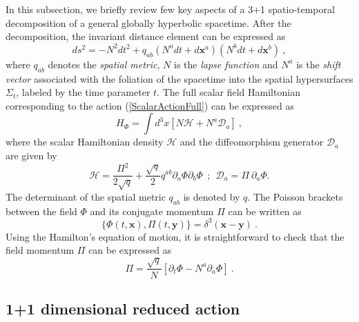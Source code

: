 \documentclass[aps,twocolumn,showpacs]{revtex4}
\def\x{\mathbf{x}}
\def\y{\mathbf{y}}
\begin{document}
In this subsection, we briefly review few key aspects of a 3+1 
spatio-temporal decomposition \cite{book:3plus1} of a general globally 
hyperbolic spacetime. After the decomposition, the invariant distance element 
can be expressed as
%
\begin{equation}\label{GeneralMetricIn31}
ds^2 = -N^2 dt^2 + q_{ab}(N^a dt+d\x^{a})(N^b dt + d\x^{b}) ~,
\end{equation}
% 
where $q_{ab}$ denotes the \emph{spatial metric}, $N$ is the \emph{lapse 
function} and $N^a$ is the \emph{shift vector} associated with the foliation of 
the spacetime into the spatial hypersurfaces $\Sigma_t$, labeled by the 
time parameter $t$.
%
The full scalar field Hamiltonian corresponding to the action 
(\ref{ScalarActionFull}) can be expressed as
%
\begin{equation}\label{GeneralScalarFieldHamiltonianFull}
H_{\Phi} = \int d^{3}x \left[ N \mathcal{H} + N^a \mathcal{D}_a \right] ~,
\end{equation}
%
where the scalar Hamiltonian density $\mathcal{H}$ and the diffeomorphism 
generator $\mathcal{D}_a$ are given by
%
\begin{equation}\label{ScalarHamiltonianAndDiffeomorphismFull}
\mathcal{H} = \frac{\Pi^2}{2\sqrt{q}} + 
\frac{\sqrt{q}}{2} q^{ab} \partial_{a}\Phi \partial_{b}\Phi  
~~;~~  
\mathcal{D}_a = \Pi~ \partial_a \Phi
.
\end{equation}
%
The determinant of the spatial metric $q_{ab}$ is denoted by $q$. The Poisson 
brackets between the field $\Phi$ and its conjugate   momentum $\Pi$ can be 
written as
%
\begin{equation}\label{PoissonBracketFull}
\{\Phi(t,\x), \Pi(t,\y)\} = \delta^3(\x-\y) ~.
\end{equation}
%
Using the Hamilton's equation of motion, it is straightforward to check that 
the field momentum $\Pi$ can be expressed as 
%
\begin{equation}\label{FieldMomentumGeneral}
\Pi = \frac{\sqrt{q}}{N} 
\left[\partial_{t}\Phi - N^a \partial_{a}\Phi \right] ~.
\end{equation}
%



\subsection{1+1 dimensional reduced action}
\end{document}
